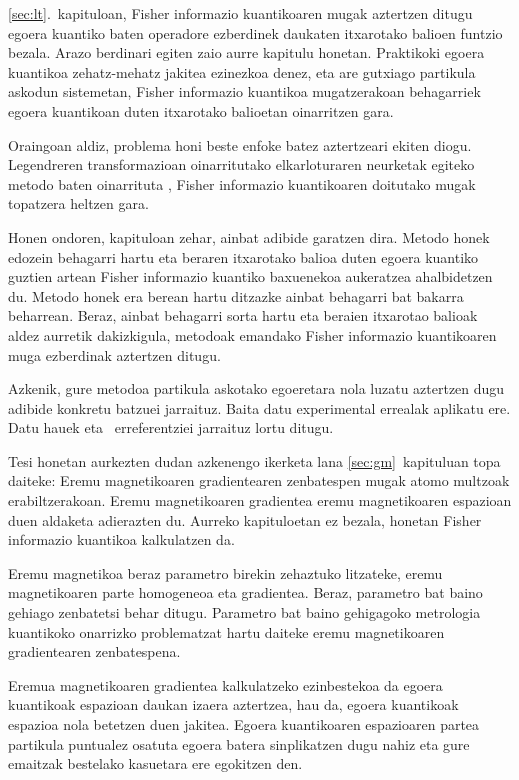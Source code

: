 \ref{sec:lt}.~kapituloan, Fisher informazio kuantikoaren mugak aztertzen ditugu egoera kuantiko baten operadore ezberdinek daukaten itxarotako balioen funtzio bezala.
Arazo berdinari egiten zaio aurre kapitulu honetan.
Praktikoki egoera kuantikoa zehatz-mehatz jakitea ezinezkoa denez, eta are gutxiago partikula askodun sistemetan, Fisher informazio kuantikoa mugatzerakoan behagarriek egoera kuantikoan duten itxarotako balioetan oinarritzen gara.

Oraingoan aldiz, problema honi beste enfoke batez aztertzeari ekiten diogu.
Legendreren transformazioan oinarritutako elkarloturaren neurketak egiteko metodo baten oinarrituta \cite{Guehne2007}, Fisher informazio kuantikoaren doitutako mugak topatzera heltzen gara.

Honen ondoren, kapituloan zehar, ainbat adibide garatzen dira.
Metodo honek edozein behagarri hartu eta beraren itxarotako balioa duten egoera kuantiko guztien artean Fisher informazio kuantiko baxuenekoa aukeratzea ahalbidetzen du.
Metodo honek era berean hartu ditzazke ainbat behagarri bat bakarra beharrean.
Beraz, ainbat behagarri sorta hartu eta beraien itxarotao balioak aldez aurretik dakizkigula, metodoak emandako Fisher informazio kuantikoaren muga ezberdinak aztertzen ditugu.

Azkenik, gure metodoa partikula askotako egoeretara nola luzatu aztertzen dugu adibide konkretu batzuei jarraituz.
Baita datu experimental errealak aplikatu ere.
Datu hauek \cite{Luecke2014} eta \cite{Gross2010}~erreferentziei jarraituz lortu ditugu.

Tesi honetan aurkezten dudan azkenengo ikerketa lana \ref{sec:gm}~kapituluan topa daiteke: Eremu magnetikoaren gradientearen zenbatespen mugak atomo multzoak erabiltzerakoan.
Eremu magnetikoaren gradientea eremu magnetikoaren espazioan duen aldaketa adierazten du.
Aurreko kapituloetan ez bezala, honetan Fisher informazio kuantikoa kalkulatzen da.

Eremu magnetikoa beraz parametro birekin zehaztuko litzateke, eremu magnetikoaren parte homogeneoa eta gradientea.
Beraz, parametro bat baino gehiago zenbatetsi behar ditugu.
Parametro bat baino gehigagoko metrologia kuantikoko onarrizko problematzat hartu daiteke eremu magnetikoaren gradientearen zenbatespena.  

Eremua magnetikoaren gradientea kalkulatzeko ezinbestekoa da egoera kuantikoak espazioan daukan izaera aztertzea, hau da, egoera kuantikoak espazioa nola betetzen duen jakitea.
Egoera kuantikoaren espazioaren partea partikula puntualez osatuta egoera batera sinplikatzen dugu nahiz eta gure emaitzak bestelako kasuetara ere egokitzen den.

